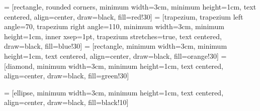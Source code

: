 
\usetikzlibrary{shapes.geometric, arrows}

 = [rectangle, rounded corners, minimum width=3cm, minimum height=1cm, text centered, align=center, draw=black, fill=red!30]
 = [trapezium, trapezium left angle=70, trapezium right angle=110, minimum width=3cm, minimum height=1cm, inner xsep=1pt, trapezium stretches=true, text centered, draw=black, fill=blue!30]
 = [rectangle, minimum width=3cm, minimum height=1cm, text centered, align=center, draw=black, fill=orange!30]
 = [diamond, minimum width=3cm, minimum height=1cm, text centered, align=center, draw=black, fill=green!30]

 = [ellipse, minimum width=3cm, minimum height=1cm, text centered, align=center, draw=black, fill=black!10]